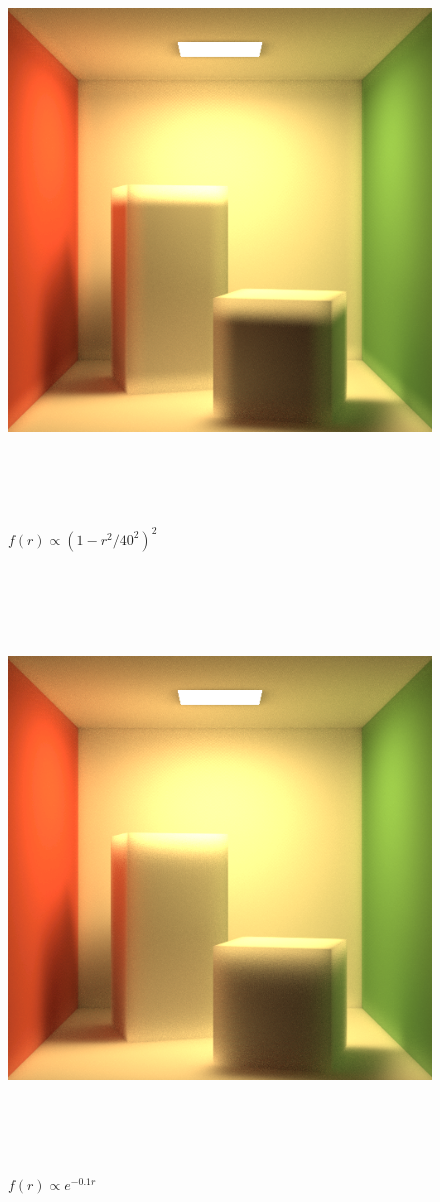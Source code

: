 \documentclass[10pt]{article}
\begin{document}
\begin{figure}[h]
	\centering
	\includegraphics[height=160mm]{one-minus-square-squared.png}
	\caption{$f(r) \propto (1-r^2/40^2)^2$}
\end{figure}

\begin{figure}[h]
	\centering
	\includegraphics[height=160mm]{exponential.png}
	\caption{$f(r) \propto e^{-0.1r}$}
\end{figure}
\end{document}
